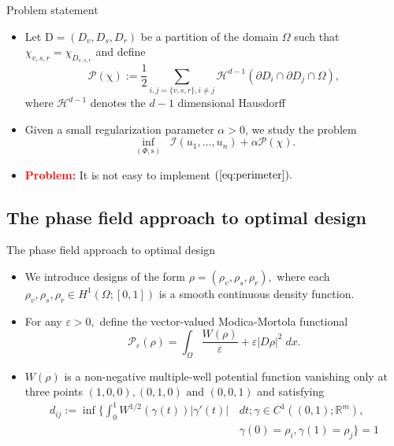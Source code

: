 \documentclass{beamer}
\newcommand{\RR}{\mathbb{R}}
\newcommand{\PP}{\mathcal{P}}
\newcommand{\p}{\rho}
\newcommand{\e}{\varepsilon}
\newcommand{\OO}{\Omega}
\begin{document}
\begin{frame}{Problem statement}
    \begin{itemize}
        \item Let $\mathrm{D}=(D_v,D_s,D_r)$ be a partition of the domain $\OO$ such that $\chi_{v,s,r}=\chi_{D_{v,s,r}}$ and define
        \begin{equation}
            \label{eq:defP}
            \mathcal{P}(\mathrm{\chi}) := \frac12 \sum_{i, j=\{v,s,r\}, i \neq j} \mathcal{H}^{d-1}\left(\partial D_i \cap \partial D_j \cap \Omega\right),
        \end{equation} 
        where $\mathcal{H}^{d-1}$ denotes the $d-1$ dimensional Hausdorff
        \bigskip
        \item Given a small regularization parameter $\alpha > 0$, we study the problem
        \begin{equation}\label{eq:perimeter}
            \inf_{(\Phi,\mathrm{s})}\;\; \mathcal{I}(u_1,\dots,u_n) + \alpha\mathcal{P}(\chi).
        \end{equation}
        \bigskip
        \item \textcolor{red}{\bf Problem:} It is not easy to implement $(\ref{eq:perimeter}).$
    \end{itemize}
\end{frame}

\subsection{The phase field approach  to optimal design}
\begin{frame}{The phase field approach  to optimal design}
\begin{itemize}
    \item We introduce designs of the form $\p = (\p_v,\p_s,\p_r),$
    where each $\p_v,\p_s,\p_r \in H^1(\OO;[0,1])$ is a smooth continuous density function.

    \item For any $\varepsilon>0,$ define the vector-valued Modica-Mortola functional
    \begin{equation}\label{vector-valued-mm}
        \PP_{\varepsilon}(\p)= \int_{\OO}\frac{W(\rho)}{\e}+\e|D\rho|^2\; dx.
    \end{equation}
    \item $W(\p)$ is a non-negative multiple-well potential function vanishing only at three points $(1,0,0),(0,1,0)\text{ and }(0,0,1)$
    and satisfying
    \begin{align*}
        \label{eq:normalizationW}
        d_{ij}:= \inf \Biggl\{\int_0^1 W^{1/2}(\gamma(t))|\gamma'(t)|\,&dt; \gamma \in C^{1}((0,1);\RR^m),\\
        &\gamma(0)=\p_i,\gamma(1)=\p_j \Biggr\} = 1
    \end{align*}
\end{itemize}
\end{frame}
\end{document}
